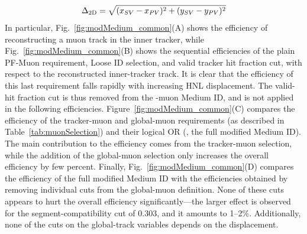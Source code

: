 $$\Delta_{\mathrm{2D}} = \sqrt{(x_{SV}-x_{PV})^{2} + (y_{SV}-y_{PV})^{2}}$$
In particular, Fig.~\ref{fig:modMedium_common}(A) shows the efficiency of
reconstructing a muon track in the inner tracker, while 
Fig.~\ref{fig:modMedium_common}(B) shows the sequential
efficiencies of the plain PF-Muon requirement, Loose ID selection, and
valid tracker hit fraction cut, with respect to the reconstructed
inner-tracker track. It is clear that the efficiency of
this last requirement falls rapidly with increasing HNL
displacement. The valid-hit fraction cut is thus removed from the
\displ-muon Medium ID, and is not applied in the following
efficiencies.
Figure~\ref{fig:modMedium_common}(C) compares the efficiency of the
tracker-muon and global-muon requirements (as described in
Table~\ref{tab:muonSelection}) and their logical OR (\ie, the full
modified Medium ID). The main contribution to the efficiency comes
from the tracker-muon selection, while the addition of the global-muon
selection only increases the overall efficiency by few percent.
Finally, Fig.~\ref{fig:modMedium_common}(D) compares the efficiency of
the full modified Medium ID with the efficiencies obtained by removing
individual cuts from the global-muon definition. None of these cuts
appears to hurt the overall efficiency significantly---the larger
effect is observed for the segment-compatibility cut of 0.303, and it
amounts to 1--2\%. Additionally, none of the cuts on the global-track
variables depends on the displacement.
